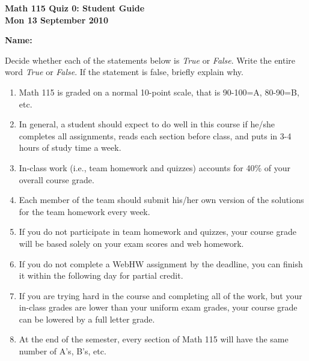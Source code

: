 \documentclass[11pt,letterpaper]{article}
\begin{document}
\flushleft
\begin{multicols}{2}


\begin{large}\textbf{Math 115 Quiz 0: Student Guide \\
Mon 13 September 2010}\end{large}

\textbf{Name:  }\underline{\hspace{35ex}}

\vspace{.5in}

\end{multicols}

\pagestyle{empty}


\flushleft

Decide whether each of the statements below is \emph{True} or \emph{False}.  Write the entire word \emph{True} or \emph{False}.  If the statement is false, briefly explain why.  


\begin{enumerate}
\item  Math 115 is graded on a normal 10-point scale, that is 90-100=A, 80-90=B, etc.  
\vfill
\item  In general, a student should expect to do well in this course if he/she completes all assignments, reads each section before class, and puts in 3-4 hours of study time a week.
\vfill
\item In-class work (i.e., team homework and quizzes) accounts for 40\% of your overall course grade.
\vfill
\item Each member of the team should submit his/her own version of the solutions for the team homework every week.
\vfill

\item If you do not participate in team homework and quizzes, your course grade will be based solely on your exam scores and web homework.
\vfill

\item If you do not complete a WebHW assignment by the deadline, you can finish it within the following day for partial credit.
\vfill
\item  If you are trying hard in the course and completing all of the work, but your in-class grades are lower than your uniform exam grades, your course grade can be lowered  by a full letter grade.
\vfill
\item  At the end of the semester, every section of Math 115 will have the same number of A's, B's, etc.

\end{enumerate}
\end{document}
